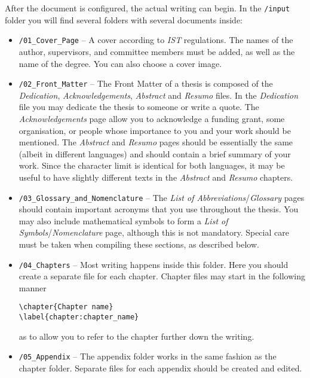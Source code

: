 After the document is configured, the actual writing can begin. In the \texttt{/input} folder you will find several folders with several documents inside:

\begin{itemize}
\item \texttt{/01\_Cover\_Page} -- A cover according to \textit{IST} regulations. The names of the author, supervisors, and committee members must be added, as well as the name of the degree. You can also choose a cover image.

\item \texttt{/02\_Front\_Matter} -- The Front Matter of a thesis is composed of the \textit{Dedication}, \textit{Acknowledgements}, \textit{Abstract} and \textit{Resumo} files. In the \textit{Dedication} file you may dedicate the thesis to someone or write a quote. The \textit{Acknowledgements} page allow you to acknowledge a funding grant, some organisation, or people whose importance to you and your work should be mentioned. The \textit{Abstract} and \textit{Resumo} pages should be essentially the same (albeit in different languages) and should contain a brief summary of your work. Since the character limit is identical for both languages, it may be useful to have slightly different texts in the \textit{Abstract} and \textit{Resumo} chapters.

\item \texttt{/03\_Glossary\_and\_Nomenclature} -- The \textit{List of Abbreviations}/\textit{Glossary} pages should contain important acronyms that you use throughout the thesis. You may also include mathematical symbols to form a \textit{List of Symbols}/\textit{Nomenclature} page, although this is not mandatory. Special care must be taken when compiling these sections, as described below.

\item \texttt{/04\_Chapters} -- Most writing happens inside this folder. Here you should create a separate file for each chapter. Chapter files may start in the following manner

\begin{verbatim}
\chapter{Chapter name}
\label{chapter:chapter_name}
\end{verbatim}


\noindent as to allow you to refer to the chapter further down the writing.

\item \texttt{/05\_Appendix} -- The appendix folder works in the same fashion as the chapter folder. Separate files for each appendix should be created and edited.
\end{itemize}

